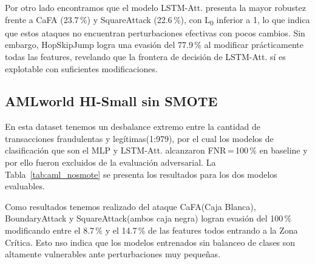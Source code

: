 Por otro lado encontramos que el modelo LSTM-Att. presenta la mayor robustez frente a CaFA (23.7\,\%) y SquareAttack (22.6\,\%), con L\textsubscript{0} inferior a 1, lo que indica que estos ataques no encuentran perturbaciones efectivas con pocos cambios. Sin embargo, HopSkipJump logra una evasión del 77.9\,\% al modificar prácticamente todas las features, revelando que la frontera de decisión de LSTM-Att. sí es explotable con suficientes modificaciones.

\subsection{AMLworld HI-Small sin SMOTE}

En esta dataset tenemos un desbalance extremo entre la cantidad de transacciones fraudulentas y legítimas(1:979), por el cual los modelos de clasificación que son el MLP y LSTM-Att. alcanzaron FNR\,=\,100\,\% en baseline y por ello fueron excluidos de la evaluación adversarial. La Tabla~\ref{tab:aml_nosmote} se presenta los resultados para los dos modelos evaluables.

\begin{table}[H]
\centering
\caption{Resultados adversariales}
\label{tab:aml_nosmote}
\end{table}

Como resultados tenemos realizado del ataque CaFA(Caja Blanca), BoundaryAttack y SquareAttack(ambos caja negra) logran evasión del 100\,\% modificando entre el 8.7\,\% y el 14.7\,\% de las features todos entrando a la Zona Crítica. Esto nso indica que los modelos entrenados sin balanceo de clases son altamente vulnerables ante perturbaciones muy pequeñas.

